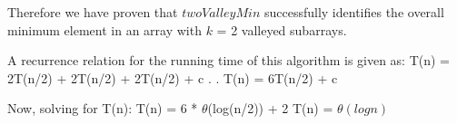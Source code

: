 \documentclass[12pt]{article}
\begin{document}
\begin{enumerate}
\begin{enumerate}
    Therefore we have proven that $twoValleyMin$ successfully identifies the overall minimum element in an array with $k$ = 2 valleyed subarrays. 
    
    A recurrence relation for the running time of this algorithm is given as:
    \newline
    T(n) = 2T(n/2) + 2T(n/2) + 2T(n/2) + c \newline
    . \newline
    . \newline
    T(n) = 6T(n/2) + c

    \newline
    Now, solving for T(n): \newline
    T(n) = 6 * $\theta$(log(n/2)) + 2 \newline
    T(n) = $\theta(logn)$
    
    
    
\end{enumerate}
\pagebreak
\end{enumerate}
\end{document}
